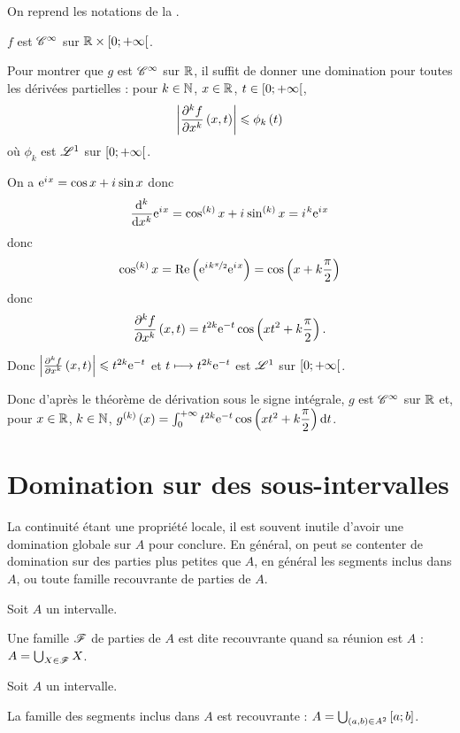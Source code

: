 \begin{corr}
On reprend les notations de la .

\(f\) est \(\mathscr{C}^{\infty}\) sur \(\mathbb{R}\times\left[0;+\infty\right[\).

Pour montrer que \(g\) est \(\mathscr{C}^{\infty}\) sur \(\mathbb{R}\), il suffit de donner une domination pour toutes les dérivées partielles : pour \(k\in\mathbb{N}\), \(x\in\mathbb{R}\), \(t\in\left[0;+\infty\right[\), \[\left\lvert\pdv[order=k]{f}{x}\left(x,t\right)\right\rvert\leqslant\phi_k\left(t\right)\] où \(\phi_k\) est \(\integ{1}{}{}\) sur \(\left[0;+\infty\right[\).

On a \(\mathrm{e}^{i\mkern1mu x}=\cos x+i\mkern1mu\sin x\) donc \[\odv*[order=k]{\e{\i x}}{x}=\cos\deriv{k}x+\i\sin\deriv{k}x=\i^k\e{\i x}\] donc \[\cos^{\left(k\right)}x=\operatorname{Re}\left(\mathrm{e}^{i\mkern1mu k\nicefrac{\pi}{2}}\mathrm{e}^{i\mkern1mu x}\right)=\cos\left(x+k\dfrac{\pi}{2}\right)\] donc \[\pdv[order=k]{f}{x}\left(x,t\right)=t^{2k}\mathrm{e}^{-t}\cos\left(xt^2+k\dfrac{\pi}{2}\right).\]

Donc \(\left\lvert\pdv[order=k]{f}{x}\left(x,t\right)\right\rvert\leqslant t^{2k}\mathrm{e}^{-t}\) et \(t\longmapsto t^{2k}\mathrm{e}^{-t}\) est \(\integ{1}{}{}\) sur \(\left[0;+\infty\right[\).

Donc d'après le théorème de dérivation sous le signe intégrale, \(g\) est \(\mathscr{C}^{\infty}\) sur \(\mathbb{R}\) et, pour \(x\in\mathbb{R}\), \(k\in\mathbb{N}\), \(g\deriv{k}\paren{x}=\int_0^{\pinf}t^{2k}\e{-t}\cos\paren{xt^2+k\dfrac{\pi}{2}}\odif{t}\).
\end{corr}

\section{Domination sur des sous-intervalles}

La continuité étant une propriété locale, il est souvent inutile d'avoir une domination globale sur \(A\) pour conclure. En général, on peut se contenter de domination sur des parties plus petites que \(A\), en général les segments inclus dans \(A\), ou toute famille recouvrante de parties de \(A\).

\begin{defi}
Soit \(A\) un intervalle.

Une famille \(\mathscr{F}\) de parties de \(A\) est dite recouvrante quand sa réunion est \(A\) : \(A=\bigcup_{X\in\mathscr{F}}X\).
\end{defi}

\begin{prop}
Soit \(A\) un intervalle.

La famille des segments inclus dans \(A\) est recouvrante : \(A=\bigcup_{\left(a,b\right)\in A^2}\left[a;b\right]\).
\end{prop}

